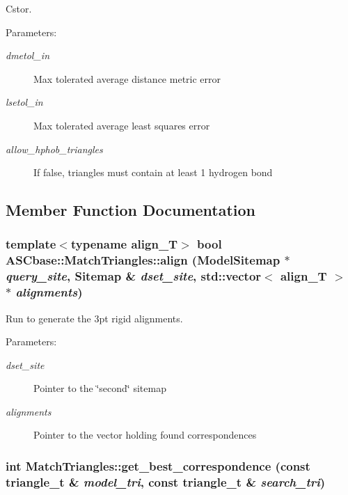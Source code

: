 Cstor. 

\begin{Desc}
\item[Parameters:]
\begin{description}
\item[{\em dmetol\_\-in}]Max tolerated average distance metric error \item[{\em lsetol\_\-in}]Max tolerated average least squares error \item[{\em allow\_\-hphob\_\-triangles}]If false, triangles must contain at least 1 hydrogen bond \end{description}
\end{Desc}


\subsection{Member Function Documentation}
\subsubsection{\setlength{\rightskip}{0pt plus 5cm}template$<$typename align\_\-T$>$ bool ASCbase::Match\-Triangles::align (\bf{Model\-Sitemap} $\ast$ {\em query\_\-site}, \bf{Sitemap} \& {\em dset\_\-site}, std::vector$<$ align\_\-T $>$ $\ast$ {\em alignments})\hspace{0.3cm}{\tt  [inline]}}\label{classASCbase_1_1MatchTriangles_e1a93a3866983cd03a85ebc19cca5908}


Run to generate the 3pt rigid alignments. 

\begin{Desc}
\item[Parameters:]
\begin{description}
\item[{\em dset\_\-site}]Pointer to the \char`\"{}second\char`\"{} sitemap \item[{\em alignments}]Pointer to the vector holding found correspondences \end{description}
\end{Desc}
\subsubsection{\setlength{\rightskip}{0pt plus 5cm}int Match\-Triangles::get\_\-best\_\-correspondence (const \bf{triangle\_\-t} \& {\em model\_\-tri}, const \bf{triangle\_\-t} \& {\em search\_\-tri})\hspace{0.3cm}{\tt  [private]}}\label{classASCbase_1_1MatchTriangles_90fabfb57f81c9a8366434de82984762}


